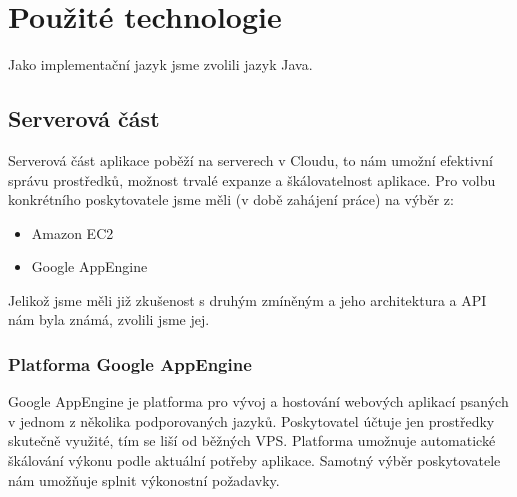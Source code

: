 \chapter{Použité technologie}

Jako implementační jazyk jsme zvolili jazyk Java.

\section{Serverová část}

Serverová část aplikace poběží na serverech v Cloudu, to nám umožní efektivní správu prostředků, možnost trvalé expanze a škálovatelnost aplikace.
Pro volbu konkrétního poskytovatele jsme měli (v době zahájení práce) na výběr z:
\begin{itemize}
    \item Amazon EC2
    \item Google AppEngine
\end{itemize}

Jelikož jsme měli již zkušenost s druhým zmíněným a jeho architektura a API nám byla známá, zvolili jsme jej.

\subsection{Platforma Google AppEngine}

Google AppEngine je platforma pro vývoj a hostování webových aplikací psaných v jednom z několika podporovaných jazyků.
Poskytovatel účtuje jen prostředky skutečně využité, tím se liší od běžných VPS.
Platforma umožnuje automatické škálování výkonu podle aktuální potřeby aplikace.
Samotný výběr poskytovatele nám umožňuje splnit výkonostní požadavky.

